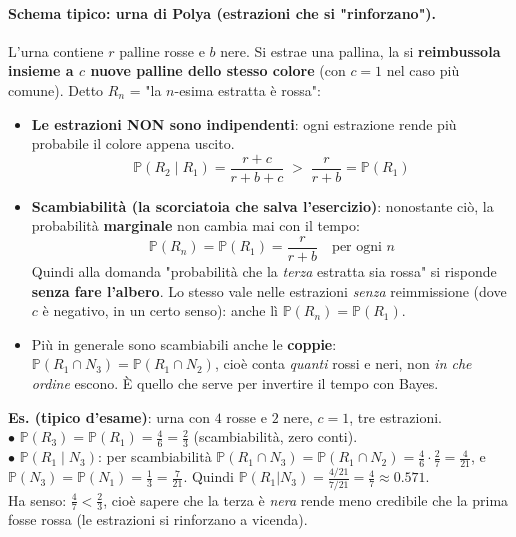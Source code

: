 \documentclass[12pt]{extarticle} %
\begin{document}
\paragraph{Schema tipico: urna di Polya (estrazioni che si "rinforzano").} L'urna contiene $r$ palline rosse e $b$ nere. Si estrae una pallina, la si \textbf{reimbussola insieme a $c$ nuove palline dello stesso colore} (con $c = 1$ nel caso più comune). Detto $R_n$ = "la $n$-esima estratta è rossa":
\begin{itemize}
    \item \textbf{Le estrazioni NON sono indipendenti}: ogni estrazione rende più probabile il colore appena uscito.
    $$ \mathbb{P}(R_2 \mid R_1) = \frac{r+c}{r+b+c} \; > \; \frac{r}{r+b} = \mathbb{P}(R_1) $$
    \item \textbf{Scambiabilità (la scorciatoia che salva l'esercizio)}: nonostante ciò, la probabilità \textbf{marginale} non cambia mai con il tempo:
    $$ \boxed{\;\mathbb{P}(R_n) = \mathbb{P}(R_1) = \frac{r}{r+b} \quad \text{per ogni } n\;} $$
    {\footnotesize Quindi alla domanda "probabilità che la \emph{terza} estratta sia rossa" si risponde \textbf{senza fare l'albero}. Lo stesso vale nelle estrazioni \emph{senza} reimmissione (dove $c$ è negativo, in un certo senso): anche lì $\mathbb{P}(R_n) = \mathbb{P}(R_1)$.}
    \item Più in generale sono scambiabili anche le \textbf{coppie}: $\mathbb{P}(R_1 \cap N_3) = \mathbb{P}(R_1 \cap N_2)$, cioè conta \emph{quanti} rossi e neri, non \emph{in che ordine} escono. È quello che serve per invertire il tempo con Bayes.
\end{itemize}
{\footnotesize \textbf{Es. (tipico d'esame)}: urna con $4$ rosse e $2$ nere, $c=1$, tre estrazioni. \\
$\bullet$ $\mathbb{P}(R_3) = \mathbb{P}(R_1) = \frac{4}{6} = \frac23$ (scambiabilità, zero conti). \\
$\bullet$ $\mathbb{P}(R_1 \mid N_3)$: per scambiabilità $\mathbb{P}(R_1 \cap N_3) = \mathbb{P}(R_1 \cap N_2) = \frac46 \cdot \frac27 = \frac{4}{21}$, e $\mathbb{P}(N_3) = \mathbb{P}(N_1) = \frac13 = \frac{7}{21}$. Quindi $\mathbb{P}(R_1|N_3) = \frac{4/21}{7/21} = \frac47 \approx 0.571$. \\
Ha senso: $\frac47 < \frac23$, cioè sapere che la terza è \emph{nera} rende meno credibile che la prima fosse rossa (le estrazioni si rinforzano a vicenda).}


\newpage
\end{document}

